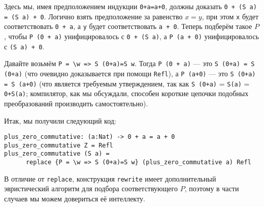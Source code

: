\documentclass[10pt,a4paper,oneside]{article}
\begin{document}
Здесь мы, имея предположением индукции \verb!0+a=a+0!, должны
доказать \verb!0 + (S a) = (S a) + 0!. Логично взять предположение
за равенство $x=y$, при этом \verb!x! будет соответствовать \verb!0 + a!,
а \verb!y! будет соответствовать \verb!a + 0!.
Теперь подберём такое $P$, чтобы \verb!P (0 + a)! 
унифицировалось с \verb!0 + (S a)!, а \verb!P (a + 0)! унифицировалось 
с \verb!(S a) + 0!.

Давайте возьмём \verb!P = \w => S (0+a)=S w!. Тогда \verb!P (0 + a)! --- это
\verb!S (0+a) = S (0+a)! (что очевидно доказывается при помощи \verb!Refl!), 
а \verb!P (a+0)! --- это \verb!S (0+a) = S (a+0)! (что является требуемым 
утверждением, так как \verb!S (0+a)! = \verb!S(a)! = \verb!0+S(a)!; компилятор,
как мы обсуждали, способен короткие цепочки подобных преобразований
производить самостоятельно).

Итак, мы получили следующий код:
\begin{verbatim}
plus_zero_commutative: (a:Nat) -> 0 + a = a + 0
plus_zero_commutative Z = Refl
plus_zero_commutative (S a) = 
      replace {P = \w => S (0+a)=S w} (plus_zero_commutative a) Refl
\end{verbatim}

В отличие от \verb!replace!, конструкция \verb!rewrite! имеет дополнительный
эвристический алгоритм для подбора соответствующего $P$, поэтому в части случаев 
мы можем довериться её интеллекту.
\end{document}
